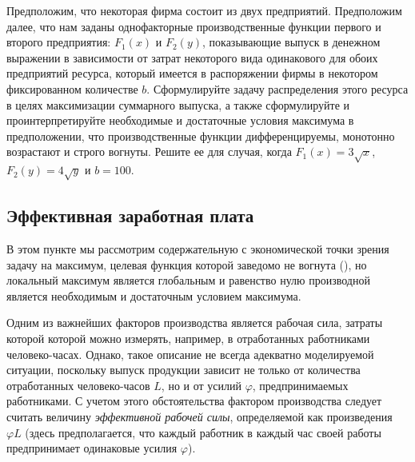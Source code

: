 \begin{exer}
    Предположим, что некоторая фирма состоит из двух предприятий.
     Предположим далее, что нам заданы однофакторные производственные функции
    первого и второго предприятия: $F_{1}(x)$ и $F_{2}(y)$,
    показывающие выпуск в денежном выражении в зависимости от затрат
    некоторого вида одинакового для обоих предприятий ресурса,
     который имеется в распоряжении фирмы в некотором фиксированном количестве $b$.
     Сформулируйте задачу распределения этого ресурса в целях
    максимизации суммарного выпуска, а также сформулируйте и проинтерпретируйте
    необходимые и достаточные условия максимума в предположении, что
    производственные функции дифференцируемы, монотонно возрастают и
    строго вогнуты. Решите ее для случая, когда
    $F_{1}(x)=3\sqrt{x}$, $F_{2}(y)=4\sqrt{y}$ и $b=100$.
\end{exer}




















\subsection{Эффективная заработная плата}

    В этом пункте мы рассмотрим содержательную с экономической точки зрения
    задачу на максимум, целевая функция которой заведомо не вогнута
    (), но
    локальный максимум является глобальным и равенство нулю
    производной является необходимым и достаточным условием
    максимума.

    Одним из важнейших
    факторов производства является рабочая сила, затраты которой которой можно
    измерять, например, в отработанных работниками человеко-часах.
    Однако, такое описание не всегда адекватно моделируемой
    ситуации, поскольку выпуск продукции зависит не только от
    количества  отработанных человеко-часов $L$, но и от усилий $\varphi$,
    предпринимаемых работниками. С учетом этого обстоятельства фактором
    производства следует считать величину \emph{эффективной рабочей силы},
    определяемой как произведения $\varphi L$ (здесь предполагается, что
    каждый работник в каждый час своей работы предпринимает одинаковые усилия
    $\varphi$).

